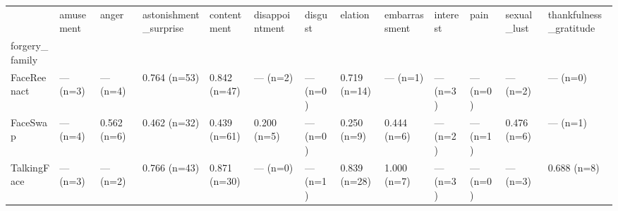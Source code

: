 \begin{tabular}{lllllllllllll}
\toprule
 & amusement & anger & astonishment\_surprise & contentment & disappointment & disgust & elation & embarrassment & interest & pain & sexual\_lust & thankfulness\_gratitude \\
forgery\_family &  &  &  &  &  &  &  &  &  &  &  &  \\
\midrule
FaceReenact & — (n=3) & — (n=4) & 0.764 (n=53) & 0.842 (n=47) & — (n=2) & — (n=0) & 0.719 (n=14) & — (n=1) & — (n=3) & — (n=0) & — (n=2) & — (n=0) \\
FaceSwap & — (n=4) & 0.562 (n=6) & 0.462 (n=32) & 0.439 (n=61) & 0.200 (n=5) & — (n=0) & 0.250 (n=9) & 0.444 (n=6) & — (n=2) & — (n=1) & 0.476 (n=6) & — (n=1) \\
TalkingFace & — (n=3) & — (n=2) & 0.766 (n=43) & 0.871 (n=30) & — (n=0) & — (n=1) & 0.839 (n=28) & 1.000 (n=7) & — (n=3) & — (n=0) & — (n=3) & 0.688 (n=8) \\
\bottomrule
\end{tabular}
